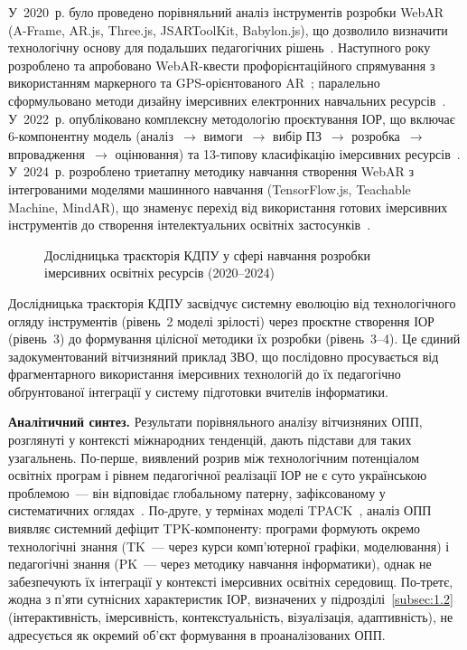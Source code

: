 У~2020~р. було проведено порівняльний аналіз інструментів розробки WebAR (A-Frame, AR.js, Three.js, JSARToolKit, Babylon.js), що дозволило визначити технологічну основу для подальших педагогічних рішень~\cite{Shepiliev2020WebAR}. Наступного року розроблено та апробовано WebAR-квести профорієнтаційного спрямування з використанням маркерного та GPS-орієнтованого AR~\cite{Shepiliev2021Career}; паралельно сформульовано методи дизайну імерсивних електронних навчальних ресурсів~\cite{Semerikov2021IERDesignACM}. У~2022~р. опубліковано комплексну методологію проєктування ІОР, що включає 6-компонентну модель (аналіз~$\to$ вимоги~$\to$ вибір ПЗ~$\to$ розробка~$\to$ впровадження~$\to$ оцінювання) та 13-типову класифікацію імерсивних ресурсів~\cite{Semerikov2022IERDesign}. У~2024~р. розроблено триетапну методику навчання створення WebAR з інтегрованими моделями машинного навчання (TensorFlow.js, Teachable Machine, MindAR), що знаменує перехід від використання готових імерсивних інструментів до створення інтелектуальних освітніх застосунків~\cite{Semerikov2024WebARML_CoSinE, Semerikov2024WebAR_EduDim}.

\begin{figure}[!h]
\centering

\caption{Дослідницька траєкторія КДПУ у сфері навчання розробки імерсивних освітніх ресурсів (2020--2024)}
\label{fig:1.10}
\end{figure}

Дослідницька траєкторія КДПУ засвідчує системну еволюцію від технологічного огляду інструментів (рівень~2 моделі зрілості) через проєктне створення ІОР (рівень~3) до формування цілісної методики їх розробки (рівень~3--4). Це єдиний задокументований вітчизняний приклад ЗВО, що послідовно просувається від фрагментарного використання імерсивних технологій до їх педагогічно обґрунтованої інтеграції у систему підготовки вчителів інформатики.

\textbf{Аналітичний синтез.} Результати порівняльного аналізу вітчизняних ОПП, розглянуті у контексті міжнародних тенденцій, дають підстави для таких узагальнень. По-перше, виявлений розрив між технологічним потенціалом освітніх програм і рівнем педагогічної реалізації ІОР не є суто українською проблемою~--- він відповідає глобальному патерну, зафіксованому у систематичних оглядах~\cite{Angelov2025Synergy, Taggart2023Makers}. По-друге, у термінах моделі TPACK~\cite{BeldaMedina2022TPACK}, аналіз ОПП виявляє системний дефіцит TPK-компоненту: програми формують окремо технологічні знання (TK~--- через курси комп'ютерної графіки, моделювання) і педагогічні знання (PK~--- через методику навчання інформатики), однак не забезпечують їх інтеграції у контексті імерсивних освітніх середовищ. По-третє, жодна з п'яти сутнісних характеристик ІОР, визначених у підрозділі~\ref{subsec:1.2} (інтерактивність, імерсивність, контекстуальність, візуалізація, адаптивність), не адресується як окремий об'єкт формування в проаналізованих ОПП.

